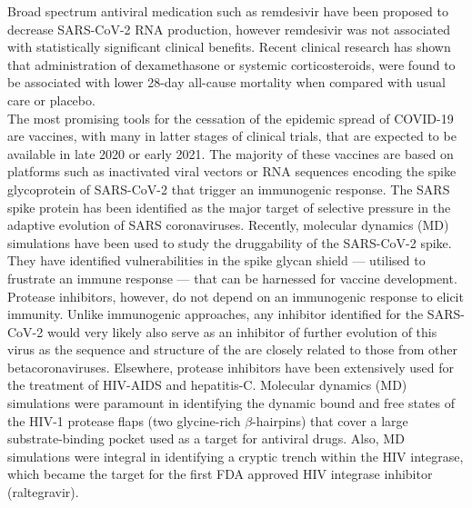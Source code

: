 Broad spectrum antiviral medication such as remdesivir have been proposed to decrease SARS-CoV-2 RNA production, however remdesivir was not associated with statistically significant clinical benefits.\cite{wang2020} Recent clinical research has shown that administration of dexamethasone\cite{dexamethasone} or systemic corticosteroids,\cite{steroids} were found to be associated with lower 28-day all-cause mortality when compared with usual care or placebo. \\

The most promising tools for the cessation of the epidemic spread of COVID-19 are vaccines, with many in latter stages of clinical trials, that are expected to be available in late 2020 or early 2021.\cite{world2020draft} The majority of these vaccines are based on platforms such as inactivated viral vectors or RNA sequences encoding the spike glycoprotein of SARS-CoV-2 that trigger an immunogenic response. The SARS spike protein has been identified as the major target of selective pressure in the adaptive evolution of SARS coronaviruses.\cite{zhang2006adaptive} Recently, molecular dynamics (MD) simulations have been used to study the druggability of the SARS-CoV-2 spike.\cite{RommieCasalino} They have identified vulnerabilities in the spike glycan shield --- utilised to frustrate an immune response --- that can be harnessed for vaccine development.\\

Protease inhibitors, however, do not depend on an immunogenic response to elicit immunity. Unlike immunogenic approaches, any inhibitor identified for the SARS-CoV-2 \mpro would very likely also serve as an inhibitor of further evolution of this virus as the sequence and structure of the \mpro are closely related to those from other betacoronaviruses.\cite{ullrich2020sars} Elsewhere, protease inhibitors have been extensively used for the treatment of HIV-AIDS\cite{durrant2011molecular,deeks1999hiv} and hepatitis-C\cite{lamarre2003ns3}. Molecular dynamics (MD) simulations were paramount in identifying the dynamic bound and free states of the HIV-1 protease flaps (two glycine-rich $\beta$-hairpins) that cover a large substrate-binding pocket used as a target for antiviral drugs.\cite{york1993molecular} Also, MD simulations were integral in identifying a cryptic trench within the HIV integrase, which became the target for the first FDA approved HIV integrase inhibitor (raltegravir).\cite{schames2004discovery,durrant2011molecular}\\


